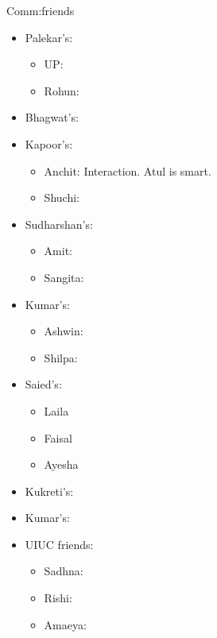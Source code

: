 \documentclass[serif, mathserif, final]{beamer}
\begin{document}
\begin{frame}[label=socialInt]
      \begin{block}{Comm:friends} 
        \begin{itemize} 
        \item Palekar’s:  
          \begin{itemize}
          \item UP: 
          \item Rohun: 
          \end{itemize} 
        \item Bhagwat’s: 
        \item Kapoor’s: 
          \begin{itemize}
            \tiny \item \tiny Anchit: Interaction. Atul is smart. 
          \item \tiny Shuchi: 
          \end{itemize}
        \item Sudharshan’s: 
          \begin{itemize} 
          \tiny \item \tiny Amit:  
          \item \tiny Sangita:  
          \end{itemize}
        \item Kumar’s:
          \begin{itemize}
            \tiny \item \tiny Ashwin: 
          \item \tiny Shilpa: 
          \end{itemize}
        \item Saied’s: 
          \begin{itemize}
            \tiny \item \tiny Laila 
          \item \tiny Faisal 
          \item \tiny Ayesha
          \end{itemize} 
        \item Kukreti’s:
        \item Kumar’s:
        \item UIUC friends: 
          \begin{itemize} 
            \tiny \item \tiny Sadhna: 
          \item \tiny Rishi: 
          \item \tiny Amaeya: 

\end{itemize}
\end{itemize}
\end{block}
\end{frame}
\end{document}
